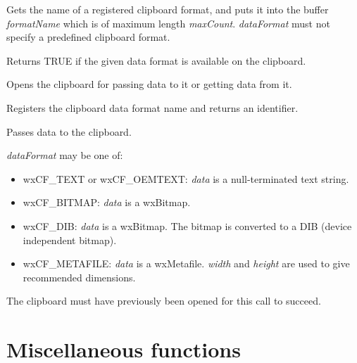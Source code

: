 Gets the name of a registered clipboard format, and puts it into the buffer {\it formatName} which is of maximum
length {\it maxCount}. {\it dataFormat} must not specify a predefined clipboard format.



Returns TRUE if the given data format is available on the clipboard.



Opens the clipboard for passing data to it or getting data from it.



Registers the clipboard data format name and returns an identifier.



Passes data to the clipboard.

{\it dataFormat} may be one of:

\begin{itemize}\itemsep=0pt
\item wxCF\_TEXT or wxCF\_OEMTEXT: {\it data} is a null-terminated text string.
\item wxCF\_BITMAP: {\it data} is a wxBitmap.
\item wxCF\_DIB: {\it data} is a wxBitmap. The bitmap is converted to a DIB (device independent bitmap).
\item wxCF\_METAFILE: {\it data} is a wxMetafile. {\it width} and {\it height} are used to give recommended dimensions.
\end{itemize}

The clipboard must have previously been opened for this call to succeed.

\section{Miscellaneous functions}\label{miscellany}


